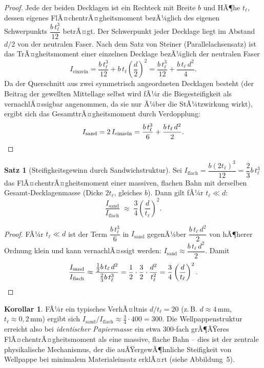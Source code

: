 ﻿\documentclass[a4paper,12pt]{article}
\theoremstyle{definition}
\newtheorem{satz}{Satz}
\newtheorem{korollar}{Korollar}
\begin{document}
\begin{proof}
	Jede der beiden Decklagen ist ein Rechteck mit Breite $b$ und HÃ¶he
	$t_\ell$, dessen eigenes FlÃ¤chentrÃ¤gheitsmoment bezÃ¼glich des eigenen
	Schwerpunkts $\dfrac{b\,t_\ell^3}{12}$ betrÃ¤gt. Der Schwerpunkt jeder
	Decklage liegt im Abstand $d/2$ von der neutralen Faser. Nach dem
	Satz von Steiner (Parallelachsensatz) ist das TrÃ¤gheitsmoment einer
	einzelnen Decklage bezÃ¼glich der neutralen Faser
	\[
		I_{\text{einzeln}} = \frac{b\,t_\ell^3}{12} + b\,t_\ell \left(\frac{d}{2}\right)^2
		= \frac{b\,t_\ell^3}{12} + \frac{b\,t_\ell\,d^2}{4}.
	\]
	Da der Querschnitt aus zwei symmetrisch angeordneten Decklagen besteht
	(der Beitrag der gewellten Mittellage selbst wird fÃ¼r die Biegesteifigkeit
	als vernachlÃ¤ssigbar angenommen, da sie nur Ã¼ber die StÃ¼tzwirkung wirkt),
	ergibt sich das GesamttrÃ¤gheitsmoment durch Verdopplung:
	\[
		I_{\mathrm{sand}} = 2\,I_{\text{einzeln}}
		= \frac{b\,t_\ell^3}{6} + \frac{b\,t_\ell\,d^2}{2}. \qedhere
	\]
\end{proof}

\begin{satz}[Steifigkeitsgewinn durch Sandwichstruktur]
	\label{satz:steifigkeit}
	Sei $I_{\mathrm{flach}} = \dfrac{b(2t_\ell)^3}{12} = \dfrac{2}{3}b\,t_\ell^3$
	das FlÃ¤chentrÃ¤gheitsmoment einer massiven, flachen Bahn mit derselben
	Gesamt-Decklagenmasse (Dicke $2t_\ell$, gleiches $b$). Dann gilt fÃ¼r
	$t_\ell \ll d$:
	\[
		\frac{I_{\mathrm{sand}}}{I_{\mathrm{flach}}}
		\;\approx\; \frac{3}{4}\left(\frac{d}{t_\ell}\right)^2.
	\]
\end{satz}

\begin{proof}
	FÃ¼r $t_\ell \ll d$ ist der Term $\dfrac{b\,t_\ell^3}{6}$ in
	$I_{\mathrm{sand}}$ gegenÃ¼ber $\dfrac{b\,t_\ell\,d^2}{2}$ von
	hÃ¶herer Ordnung klein und kann vernachlÃ¤ssigt werden:
	$I_{\mathrm{sand}} \approx \dfrac{b\,t_\ell\,d^2}{2}$. Damit
	\[
		\frac{I_{\mathrm{sand}}}{I_{\mathrm{flach}}}
		\approx \frac{\frac{1}{2}b\,t_\ell\,d^2}{\frac{2}{3}b\,t_\ell^3}
		= \frac{1}{2} \cdot \frac{3}{2} \cdot \frac{d^2}{t_\ell^2}
		= \frac{3}{4}\left(\frac{d}{t_\ell}\right)^2. \qedhere
	\]
\end{proof}

\begin{korollar}
	FÃ¼r ein typisches VerhÃ¤ltnis $d/t_\ell = 20$ (z.\,B. $d \approx 4\,\mathrm{mm}$,
	$t_\ell \approx 0{,}2\,\mathrm{mm}$) ergibt sich
	$I_{\mathrm{sand}}/I_{\mathrm{flach}} \approx \tfrac{3}{4}\cdot 400 = 300$.
	Die Wellpappenstruktur erreicht also bei \emph{identischer Papiermasse} ein
	etwa $300$-fach grÃ¶ÃŸeres FlÃ¤chentrÃ¤gheitsmoment als eine massive, flache
	Bahn -- dies ist der zentrale physikalische Mechanismus, der die
	auÃŸergewÃ¶hnliche Steifigkeit von Wellpappe bei minimalem Materialeinsatz
	erklÃ¤rt (siehe Abbildung~5).
\end{korollar}
\end{document}
